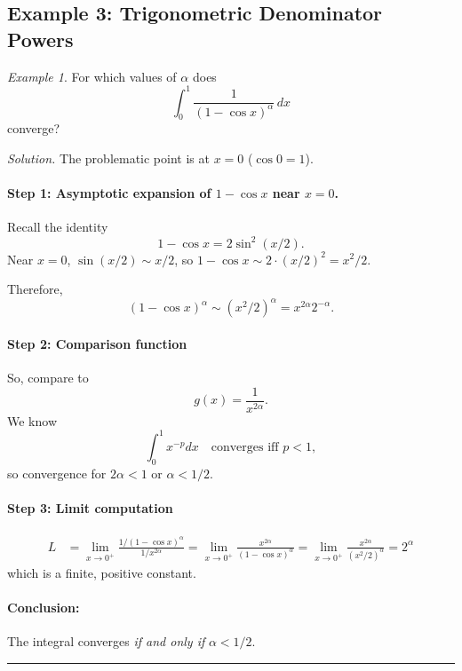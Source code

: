 \documentclass[12pt]{article}
\theoremstyle{definition}
\theoremstyle{plain}
\theoremstyle{remark}
\newtheorem{example}[definition]{Example}
\begin{document}
\subsection{Example 3: Trigonometric Denominator Powers}
\begin{example}
For which values of $\alpha$ does
\[
\int_0^1 \frac{1}{(1 - \cos x)^\alpha}\, dx
\]
converge?

\emph{Solution.} The problematic point is at $x=0$ ($\cos 0 = 1$).

\paragraph{Step 1: Asymptotic expansion of $1-\cos x$ near $x = 0$.}
Recall the identity
\[
1 - \cos x = 2\sin^2(x/2).
\]
Near $x=0$, $\sin(x/2) \sim x/2$, so $1-\cos x \sim 2\cdot(x/2)^2 = x^2/2$.

Therefore,
\[
(1-\cos x)^\alpha \sim (x^2/2)^\alpha = x^{2\alpha} 2^{-\alpha}.
\]

\paragraph{Step 2: Comparison function}
So, compare to
\[
g(x) = \frac{1}{x^{2\alpha}}.
\]
We know
\[
\int_0^1 x^{-p} dx \quad \text{converges iff } p < 1,
\]
so convergence for $2\alpha<1$ or $\alpha<1/2$.

\paragraph{Step 3: Limit computation}
\begin{align*}
L &= \lim_{x \to 0^+} \frac{1/(1-\cos x)^\alpha}{1/x^{2\alpha}}
= \lim_{x \to 0^+} \frac{x^{2\alpha}}{(1-\cos x)^\alpha}
= \lim_{x \to 0^+} \frac{x^{2\alpha}}{(x^2/2)^\alpha} = 2^{\alpha}
\end{align*}
which is a finite, positive constant.

\paragraph{Conclusion:}
The integral converges \emph{if and only if} $\alpha < 1/2$.
\end{example}

\hrule
\end{document}
